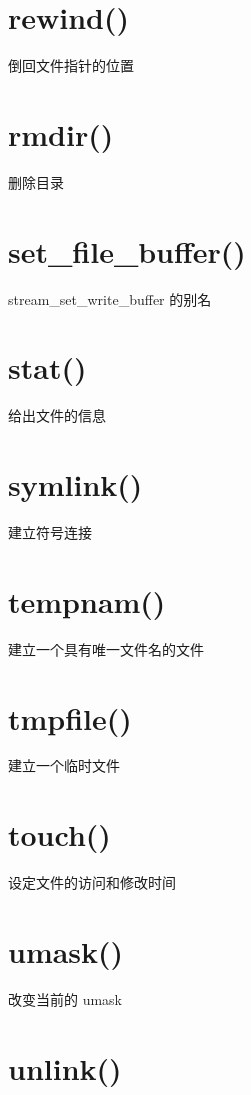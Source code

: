 \section{rewind()}

倒回文件指针的位置

\section{rmdir()}

删除目录

\section{set\_file\_buffer()}

stream\_set\_write\_buffer 的别名

\section{stat()}

给出文件的信息

\section{symlink()}

建立符号连接

\section{tempnam()}

 建立一个具有唯一文件名的文件
 
\section{tmpfile()}

建立一个临时文件

\section{touch()}

设定文件的访问和修改时间

\section{umask()}

改变当前的 umask

\section{unlink()}

